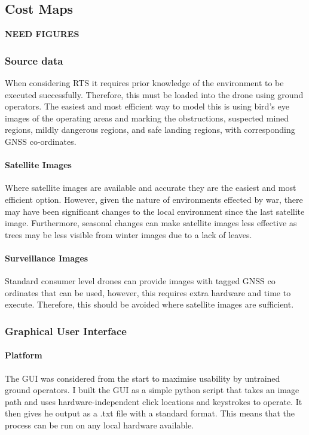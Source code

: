 \subsection{Cost Maps}
\textbf{NEED FIGURES}
\subsubsection{Source data}
When considering \gls{RTS} it requires prior knowledge of the environment to be executed successfully. Therefore, this must be loaded into the drone using ground operators. The easiest and most efficient way to model this is using bird's eye images of the operating areas and marking the obstructions, suspected mined regions, mildly dangerous regions, and safe landing regions, with corresponding \gls{GNSS} co-ordinates.
\paragraph{Satellite Images}
Where satellite images are available and accurate they are the easiest and most efficient option. However, given the nature of environments effected by war, there may have been significant changes to the local environment since the last satellite image. Furthermore, seasonal changes can make satellite images less effective as trees may be less visible from winter images due to a lack of leaves.
\paragraph{Surveillance Images}
Standard consumer level drones can provide images with tagged \gls{GNSS} co ordinates that can be used, however, this requires extra hardware and time to execute. Therefore, this should be avoided where satellite images are sufficient.

\subsubsection{Graphical User Interface}
\paragraph{Platform} 
The \gls{GUI} was considered from the start to maximise usability by untrained ground operators. I built the \gls{GUI} as a simple python script that takes an image path and uses hardware-independent click locations and keystrokes to operate. It then gives he output as a .txt file with a standard format. This means that the process can be run on any local hardware available.
